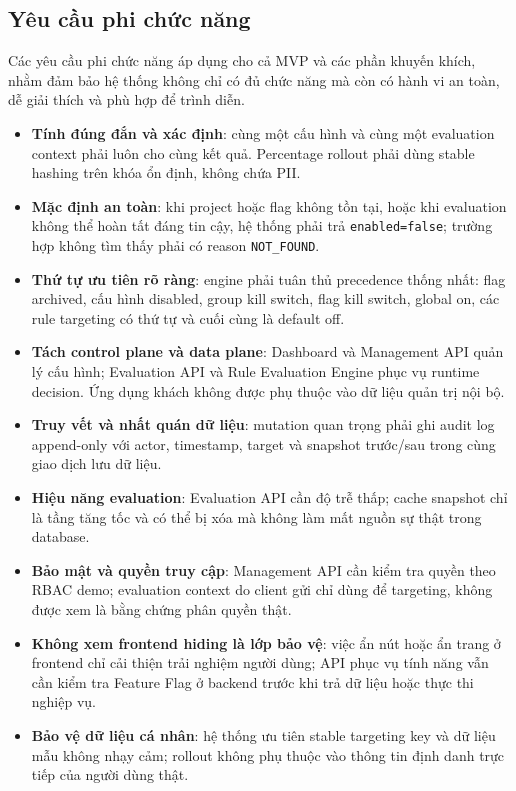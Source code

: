 \setcounter{subsection}{2}
\subsection{Yêu cầu phi chức năng}

Các yêu cầu phi chức năng áp dụng cho cả MVP và các phần khuyến khích, nhằm đảm bảo hệ thống không chỉ có đủ chức năng mà còn có hành vi an toàn, dễ giải thích và phù hợp để trình diễn.

\begin{itemize}
    \item \textbf{Tính đúng đắn và xác định}: cùng một cấu hình và cùng một evaluation context phải luôn cho cùng kết quả. Percentage rollout phải dùng stable hashing trên khóa ổn định, không chứa PII.
    \item \textbf{Mặc định an toàn}: khi project hoặc flag không tồn tại, hoặc khi evaluation không thể hoàn tất đáng tin cậy, hệ thống phải trả \texttt{enabled=false}; trường hợp không tìm thấy phải có reason \texttt{NOT\_FOUND}.
    \item \textbf{Thứ tự ưu tiên rõ ràng}: engine phải tuân thủ precedence thống nhất: flag archived, cấu hình disabled, group kill switch, flag kill switch, global on, các rule targeting có thứ tự và cuối cùng là default off.
    \item \textbf{Tách control plane và data plane}: Dashboard và Management API quản lý cấu hình; Evaluation API và Rule Evaluation Engine phục vụ runtime decision. Ứng dụng khách không được phụ thuộc vào dữ liệu quản trị nội bộ.
    \item \textbf{Truy vết và nhất quán dữ liệu}: mutation quan trọng phải ghi audit log append-only với actor, timestamp, target và snapshot trước/sau trong cùng giao dịch lưu dữ liệu.
    \item \textbf{Hiệu năng evaluation}: Evaluation API cần độ trễ thấp; cache snapshot chỉ là tầng tăng tốc và có thể bị xóa mà không làm mất nguồn sự thật trong database.
    \item \textbf{Bảo mật và quyền truy cập}: Management API cần kiểm tra quyền theo RBAC demo; evaluation context do client gửi chỉ dùng để targeting, không được xem là bằng chứng phân quyền thật.
    \item \textbf{Không xem frontend hiding là lớp bảo vệ}: việc ẩn nút hoặc ẩn trang ở frontend chỉ cải thiện trải nghiệm người dùng; API phục vụ tính năng vẫn cần kiểm tra Feature Flag ở backend trước khi trả dữ liệu hoặc thực thi nghiệp vụ.
    \item \textbf{Bảo vệ dữ liệu cá nhân}: hệ thống ưu tiên stable targeting key và dữ liệu mẫu không nhạy cảm; rollout không phụ thuộc vào thông tin định danh trực tiếp của người dùng thật.

\end{itemize}
